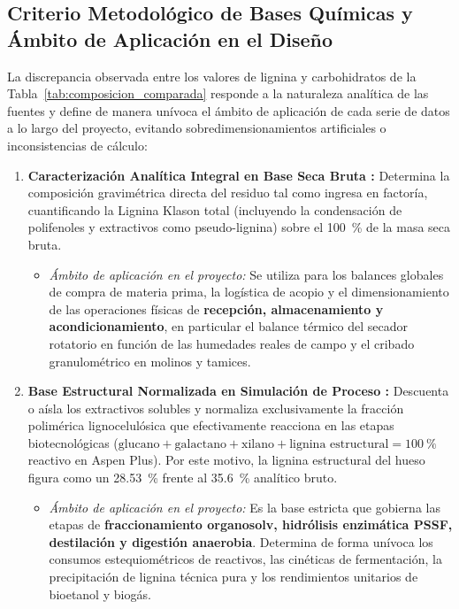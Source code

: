 \documentclass{report}
\begin{document}
\subsection*{Criterio Metodológico de Bases Químicas y Ámbito de Aplicación en el Diseño}
La discrepancia observada entre los valores de lignina y carbohidratos de la Tabla~\ref{tab:composicion_comparada} responde a la naturaleza analítica de las fuentes y define de manera unívoca el ámbito de aplicación de cada serie de datos a lo largo del proyecto, evitando sobredimensionamientos artificiales o inconsistencias de cálculo:
\begin{enumerate}
    \item \textbf{Caracterización Analítica Integral en Base Seca Bruta \autocite{MoranAlarcon2026, RomeroGarcia2022}:}
    Determina la composición gravimétrica directa del residuo tal como ingresa en factoría, cuantificando la Lignina Klason total (incluyendo la condensación de polifenoles y extractivos como pseudo-lignina) sobre el \SI{100}{\percent} de la masa seca bruta.
    \begin{itemize}
        \item \textit{Ámbito de aplicación en el proyecto:} Se utiliza para los balances globales de compra de materia prima, la logística de acopio y el dimensionamiento de las operaciones físicas de \textbf{recepción, almacenamiento y acondicionamiento}, en particular el balance térmico del secador rotatorio en función de las humedades reales de campo y el cribado granulométrico en molinos y tamices.
    \end{itemize}
    \item \textbf{Base Estructural Normalizada en Simulación de Proceso \autocite{Jafari-Gohargan2026}:}
    Descuenta o aísla los extractivos solubles y normaliza exclusivamente la fracción polimérica lignocelulósica que efectivamente reacciona en las etapas biotecnológicas ($\text{glucano} + \text{galactano} + \text{xilano} + \text{lignina estructural} = \SI{100}{\percent}$ reactivo en Aspen Plus). Por este motivo, la lignina estructural del hueso figura como un \SI{28.53}{\percent} frente al \SI{35.6}{\percent} analítico bruto.
    \begin{itemize}
        \item \textit{Ámbito de aplicación en el proyecto:} Es la base estricta que gobierna las etapas de \textbf{fraccionamiento organosolv, hidrólisis enzimática PSSF, destilación y digestión anaerobia}. Determina de forma unívoca los consumos estequiométricos de reactivos, las cinéticas de fermentación, la precipitación de lignina técnica pura y los rendimientos unitarios de bioetanol y biogás.
    \end{itemize}
\end{enumerate}
\end{document}
